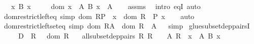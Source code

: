\begin{isabellebody}
\ \ \ {\isachardoublequoteopen}{\isasymAnd}x{\isachardot}{\kern0pt}\ B\ x\ {\isasymnoteq}\ {\isacharbraceleft}{\kern0pt}{\isacharbraceright}{\kern0pt}{\isachardoublequoteclose}\isanewline
\ \ \ {\isachardoublequoteopen}dom\ {\isacharparenleft}{\kern0pt}{\isasymSum}x\ {\isasymin}\ A{\isachardot}{\kern0pt}\ B\ x{\isacharparenright}{\kern0pt}\ {\isacharequal}{\kern0pt}\ A{\isachardoublequoteclose}\isanewline
%
\isadelimproof
\ \ %
\endisadelimproof
%
\isatagproof
{}\isamarkupfalse%
\ assms\ \isamarkupfalse%
\ {\isacharparenleft}{\kern0pt}intro\ eqI{\isacharparenright}{\kern0pt}\ auto%
\endisatagproof
{\isafoldproof}%
%
\isadelimproof
\isanewline
%
\endisadelimproof
\isanewline
{}\isamarkupfalse%
\ dom{\isacharunderscore}{\kern0pt}restrict{\isacharunderscore}{\kern0pt}left{\isacharunderscore}{\kern0pt}eq\ {\isacharbrackleft}{\kern0pt}simp{\isacharbrackright}{\kern0pt}{\isacharcolon}{\kern0pt}\ {\isachardoublequoteopen}dom\ {\isacharparenleft}{\kern0pt}R{\isasymrestriction}\isactrlbsub P\isactrlesub {\isacharparenright}{\kern0pt}\ {\isacharequal}{\kern0pt}\ {\isacharbraceleft}{\kern0pt}x\ {\isasymin}\ dom\ R\ {\isacharbar}{\kern0pt}\ P\ x{\isacharbraceright}{\kern0pt}{\isachardoublequoteclose}\isanewline
%
\isadelimproof
\ \ %
\endisadelimproof
%
\isatagproof
{}\isamarkupfalse%
\ auto%
\endisatagproof
{\isafoldproof}%
%
\isadelimproof
\isanewline
%
\endisadelimproof
\isanewline
{}\isamarkupfalse%
\ dom{\isacharunderscore}{\kern0pt}restrict{\isacharunderscore}{\kern0pt}left{\isacharunderscore}{\kern0pt}set{\isacharunderscore}{\kern0pt}eq\ {\isacharbrackleft}{\kern0pt}simp{\isacharbrackright}{\kern0pt}{\isacharcolon}{\kern0pt}\ {\isachardoublequoteopen}dom\ {\isacharparenleft}{\kern0pt}R{\isasymrestriction}\isactrlbsub A\isactrlesub {\isacharparenright}{\kern0pt}\ {\isacharequal}{\kern0pt}\ dom\ R\ {\isasyminter}\ A{\isachardoublequoteclose}%
\isadelimproof
\ %
\endisadelimproof
%
\isatagproof
{}\isamarkupfalse%
\ simp%
\endisatagproof
{\isafoldproof}%
%
\isadelimproof
%
\endisadelimproof
\isanewline
\isanewline
{}\isamarkupfalse%
\ glue{\isacharunderscore}{\kern0pt}subset{\isacharunderscore}{\kern0pt}dep{\isacharunderscore}{\kern0pt}pairsI{\isacharcolon}{\kern0pt}\isanewline
\ \ \ {\isasymR}\ \ {\isachardoublequoteopen}D\ {\isasymequiv}\ {\isasymUnion}R\ {\isasymin}\ {\isasymR}{\isachardot}{\kern0pt}\ dom\ R{\isachardoublequoteclose}\isanewline
\ \ \ all{\isacharunderscore}{\kern0pt}subset{\isacharunderscore}{\kern0pt}dep{\isacharunderscore}{\kern0pt}pairs{\isacharcolon}{\kern0pt}\ {\isachardoublequoteopen}{\isasymAnd}R{\isachardot}{\kern0pt}\ R\ {\isasymin}\ {\isasymR}\ {\isasymLongrightarrow}\ {\isasymexists}A{\isachardot}{\kern0pt}\ R\ {\isasymsubseteq}\ {\isasymSum}x\ {\isasymin}\ A{\isachardot}{\kern0pt}\ B\ x{\isachardoublequoteclose}\isanewline

\end{isabellebody}
